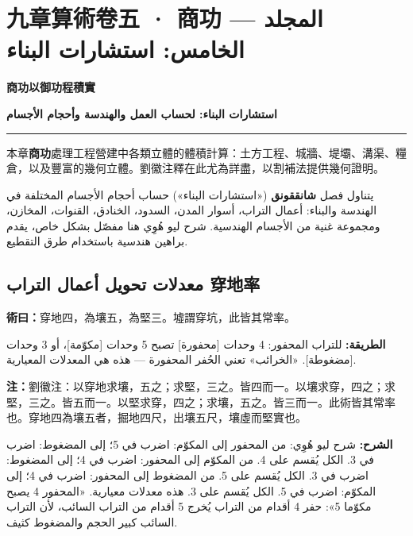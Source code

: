\documentclass[11pt,a4paper]{article}
\newcommand{\ar}[1]{\arabicfont\beginR #1\endR}
\newcommand{\longline}{\noindent\rule{\textwidth}{0.4pt}}
\newcommand{\ChinCol}[1]{\begin{minipage}[t]{0.48\textwidth}#1\end{minipage}}
\newcommand{\ArabCol}[1]{\begin{minipage}[t]{0.48\textwidth}\arabicfont\beginR #1\endR\end{minipage}}
\newcommand{\parallelsection}[2]{%
  \noindent\ChinCol{#1}\hfill\ArabCol{#2}\par\vspace{0.5cm}%
}
\newcounter{probnum}
\newcommand{\method}[2]{\par\noindent%
  \begin{minipage}[t]{0.48\textwidth}\textbf{術曰：}#1\end{minipage}%
  \hfill%
  \begin{minipage}[t]{0.48\textwidth}\arabicfont\beginR\textbf{الطريقة:} #2\endR\end{minipage}\par\vspace{0.3cm}}
\newcommand{\commentary}[2]{\par\noindent%
  \begin{minipage}[t]{0.48\textwidth}\textbf{注：}#1\end{minipage}%
  \hfill%
  \begin{minipage}[t]{0.48\textwidth}\arabicfont\beginR\textbf{الشرح:} #2\endR\end{minipage}\par\vspace{0.2cm}}
\begin{document}
\newpage

\setcounter{probnum}{0}

\section{九章算術卷五 · 商功 — \ar{المجلد الخامس: استشارات البناء}}
\label{sec:vol5}

\begin{center}
{\Large\bfseries\color{volcolor} 商功以御功程積實}

\vspace{0.2cm}

{\fontsize{14}{18}\selectfont\arabicfont\beginR\color{volcolor}\textbf{استشارات البناء: لحساب العمل والهندسة وأحجام الأجسام}\endR}
\end{center}

\vspace{0.3cm}
\longline
\vspace{0.3cm}

\parallelsection{本章\textbf{商功}處理工程營建中各類立體的體積計算：土方工程、城牆、堤壩、溝渠、糧倉，以及豐富的幾何立體。劉徽注釋在此尤為詳盡，以割補法提供幾何證明。}{يتناول فصل \textbf{شانققونق} («استشارات البناء») حساب أحجام الأجسام المختلفة في الهندسة والبناء: أعمال التراب، أسوار المدن، السدود، الخنادق، القنوات، المخازن، ومجموعة غنية من الأجسام الهندسية. شرح ليو هُوِي هنا مفصّل بشكل خاص، يقدم براهين هندسية باستخدام طرق التقطيع.}

\subsection{معدلات تحويل أعمال التراب 穿地率}

\method{穿地四，為壤五，為堅三。墟謂穿坑，此皆其常率。}{للتراب المحفور: 4 وحدات [محفورة] تصبح 5 وحدات [مكوّمة]، أو 3 وحدات [مضغوطة]. «الخرائب» تعني الحُفر المحفورة --- هذه هي المعدلات المعيارية.}

\commentary{劉徽注：以穿地求壤，五之；求堅，三之。皆四而一。以壤求穿，四之；求堅，三之。皆五而一。以堅求穿，四之；求壤，五之。皆三而一。此術皆其常率也。穿地四為壤五者，掘地四尺，出壤五尺，壤虛而堅實也。}{شرح ليو هُوِي: من المحفور إلى المكوّم: اضرب في 5؛ إلى المضغوط: اضرب في 3. الكل يُقسم على 4. من المكوّم إلى المحفور: اضرب في 4؛ إلى المضغوط: اضرب في 3. الكل يُقسم على 5. من المضغوط إلى المحفور: اضرب في 4؛ إلى المكوّم: اضرب في 5. الكل يُقسم على 3. هذه معدلات معيارية. «المحفور 4 يصبح مكوّما 5»: حفر 4 أقدام من التراب يُخرج 5 أقدام من التراب السائب، لأن التراب السائب كبير الحجم والمضغوط كثيف.}
\end{document}
